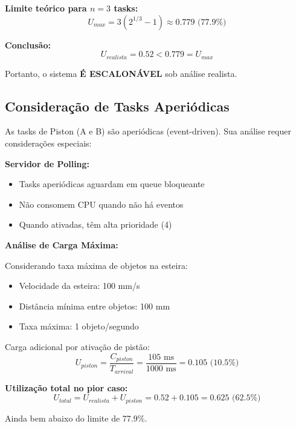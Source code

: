\documentclass[12pt,a4paper]{article}
\begin{document}
\textbf{Limite teórico para $n=3$ tasks:}
\begin{equation}
U_{max} = 3(2^{1/3} - 1) \approx 0.779 \text{ (77.9\%)}
\end{equation}

\textbf{Conclusão:}
\begin{equation}
U_{realista} = 0.52 < 0.779 = U_{max}
\end{equation}

Portanto, o sistema \textbf{É ESCALONÁVEL} sob análise realista.

\subsection{Consideração de Tasks Aperiódicas}

As tasks de Piston (A e B) são aperiódicas (event-driven). Sua análise requer considerações especiais:

\textbf{Servidor de Polling:}
\begin{itemize}
    \item Tasks aperiódicas aguardam em queue bloqueante
    \item Não consomem CPU quando não há eventos
    \item Quando ativadas, têm alta prioridade (4)
\end{itemize}

\textbf{Análise de Carga Máxima:}

Considerando taxa máxima de objetos na esteira:
\begin{itemize}
    \item Velocidade da esteira: 100 mm/s
    \item Distância mínima entre objetos: 100 mm
    \item Taxa máxima: 1 objeto/segundo
\end{itemize}

Carga adicional por ativação de pistão:
\begin{equation}
U_{piston} = \frac{C_{piston}}{T_{arrival}} = \frac{105 \text{ ms}}{1000 \text{ ms}} = 0.105 \text{ (10.5\%)}
\end{equation}

\textbf{Utilização total no pior caso:}
\begin{equation}
U_{total} = U_{realista} + U_{piston} = 0.52 + 0.105 = 0.625 \text{ (62.5\%)}
\end{equation}

Ainda bem abaixo do limite de 77.9\%.

\end{document}
